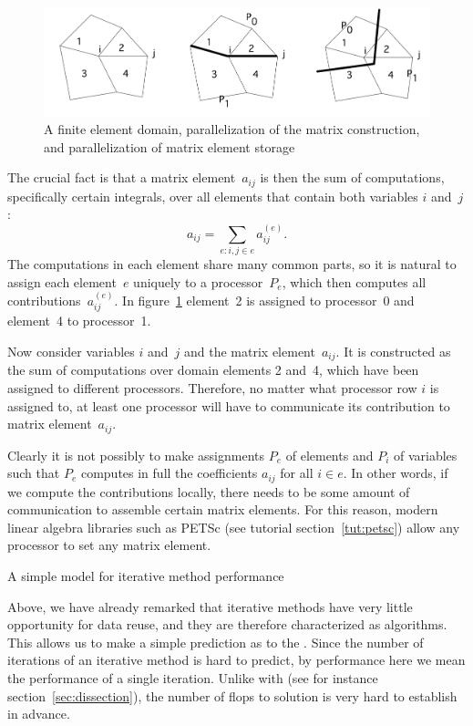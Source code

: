 \begin{figure}[ht]
  \includegraphics[scale=.12]{graphics/fem}  
  \caption{A finite element domain, parallelization of the matrix
    construction, and parallelization of matrix element storage}
  \label{fig:fem-assembly}
\end{figure}

The crucial fact is that a matrix element~$a_{ij}$ is then the sum of
computations, specifically certain integrals, over all elements that
contain both variables $i$ and~$j$:
\[ a_{ij}=\sum_{e\colon i,j\in e} a^{(e)}_{ij}. \]
The computations in each element share many common parts, so it is
natural to assign each element~$e$ uniquely to a processor~$P_e$,
which then computes all contributions~$a^{(e)}_{ij}$. In
figure~\ref{fig:fem-assembly} element~2 is assigned to processor~0
and element~4 to processor~1.

Now consider variables $i$ and~$j$ and the matrix
element~$a_{ij}$.  It is constructed as the sum of computations over
domain elements 2 and~4, which have been assigned to different processors.
Therefore, no matter what processor row $i$ is assigned to, at least
one processor will have to communicate its contribution to matrix
element~$a_{ij}$.

Clearly it is not possibly to make assignments $P_e$ of elements and
$P_i$ of variables such that $P_e$ computes in full the coefficients
$a_{ij}$ for all $i\in e$. In other words, if we compute the
contributions locally, there needs to be some amount of communication to
assemble certain matrix elements.
For this reason, modern linear algebra libraries such as PETSc (see
tutorial section~\ref{tut:petsc}) allow any processor to set any
matrix element.

 {A simple model for iterative method performance}

Above, we have already remarked that iterative methods have very little
opportunity for data reuse, and they are therefore characterized as
 algorithms. This allows us to make a simple
prediction as to the .
Since the number of iterations of an iterative method is hard to predict,
by performance here we mean the performance of a single iteration.
Unlike with 
(see for instance section~\ref{sec:dissection}),
the number of flops to solution is very hard to establish in advance.


